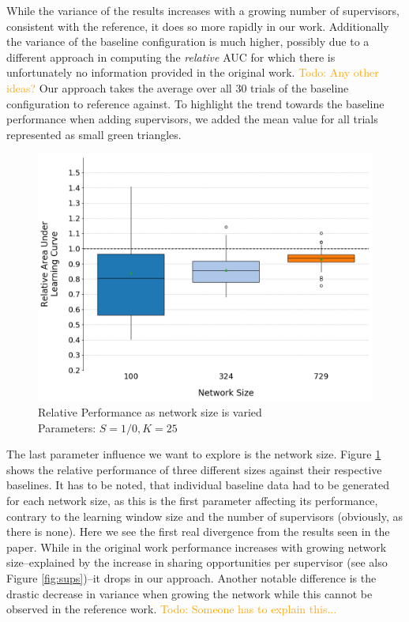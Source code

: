 \documentclass[letterpaper]{article}
\newcommand\todo[1]{\textcolor{orange}{Todo: #1}}
\begin{document}
While the variance of the results increases with a growing number of supervisors, consistent with the reference, it does so more rapidly in our work. Additionally the variance of the baseline configuration is much higher, possibly due to a different approach in computing the \textit{relative} AUC for which there is unfortunately no information provided in the original work. \todo{Any other ideas?} Our approach takes the average over all 30 trials of the baseline configuration to reference against. To highlight the trend towards the baseline performance when adding supervisors, we added the mean value for all trials represented as small green triangles.
\begin{figure}[H]
 \begin{center}
  \includegraphics[width=\linewidth]{figures/figure8}
  \caption{Relative Performance as network size is varied\\Parameters: $S=1/0,K=25$}
  \label{fig:sizes}
 \end{center}
\end{figure}

The last parameter influence we want to explore is the network size. Figure \ref{fig:sizes} shows the relative performance of three different sizes against their respective baselines. It has to be noted, that individual baseline data had to be generated for each network size, as this is the first parameter affecting its performance, contrary to the learning window size and the number of supervisors (obviously, as there is none). Here we see the first real divergence from the results seen in the paper. While in the original work performance increases with growing network size--explained by the increase in sharing opportunities per supervisor (see also Figure \ref{fig:sups})--it drops in our approach. Another notable difference is the drastic decrease in variance when growing the network while this cannot be observed in the reference work. \todo{Someone has to explain this...}
\end{document}
